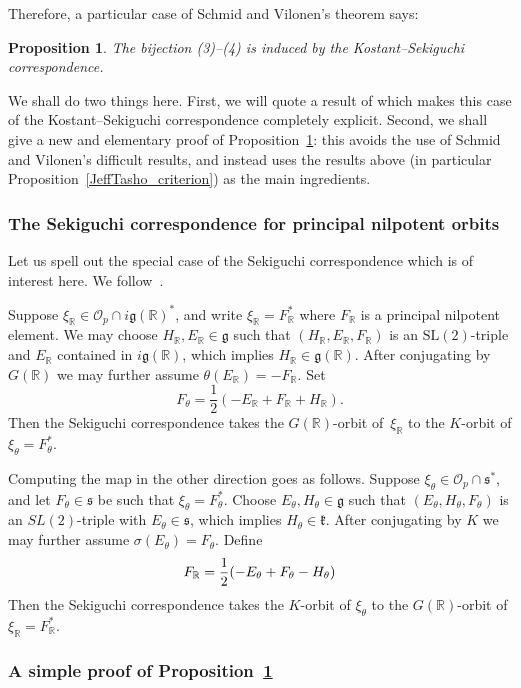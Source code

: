 \documentclass[10pt,leqno]{article}
\newtheorem{proposition}[equation]{Proposition}
\renewcommand{\O}{\mathcal O}
\newcommand{\R}{\mathbb R}
\renewcommand{\k}{\mathfrak k}
\newcommand{\g}{\mathfrak g}
\newcommand{\s}{\mathfrak s}
\newcommand{\Op}{\O_p}
\begin{document}
Therefore, a particular case of Schmid and Vilonen's theorem says: 
\begin{proposition} \label{Sekiguchi_result} The bijection (3)--(4) is induced by the Kostant--Sekiguchi correspondence.
\end{proposition} 
We shall do two things here. First, we will quote a result of \cite{AVAV} which makes this case of the Kostant--Sekiguchi correspondence completely explicit. Second, we shall give a new and elementary proof of Proposition~\ref{Sekiguchi_result}: this avoids the use of Schmid and Vilonen's difficult results, and instead uses the results above (in particular Proposition~\ref{JeffTasho_criterion}) as the main ingredients. 


\subsubsection{The Sekiguchi correspondence for principal nilpotent orbits}\label{sec:concrete_sek}
Let us spell out the special case of the Sekiguchi correspondence which is of interest here. We follow~\cite[Section~2]{AVAV}.


Suppose $\xi_\R\in \Op\cap i\g(\R)^\ast$, and write $\xi_\R = F_\R^\ast$ where $F_\R$ is a principal nilpotent element. We may choose $H_\R, E_\R \in \g$ such that $(H_\R,E_\R,F_\R)$ is an $\mathrm{SL}(2)$-triple and  $E_\R$  contained in $i\g(\R)$,
which implies $H_\R\in \g(\R)$. 
After conjugating by~$G(\R)$ we may further assume $\theta(E_\R)=-F_\R$. Set 
\[   F_\theta=\frac12(-E_\R+F_\R+H_\R).\]
Then the Sekiguchi correspondence takes the $G(\R)$-orbit of~$\xi_\R$ to the $K$-orbit of $\xi_\theta=F_\theta^\ast$. 

Computing the map in the other direction goes as follows.
Suppose $\xi_\theta \in \Op\cap \s^\ast$, and let $F_\theta \in \s$ be such that $\xi_\theta=F_\theta^\ast$. Choose $E_\theta, H_\theta \in \g$ such that $(E_\theta, H_\theta, F_\theta)$ is an $SL(2)$-triple with $E_\theta \in \s$,  which implies $H_\theta\in\k$. After conjugating by $K$ we may further assume $\sigma(E_\theta)=F_\theta$.
Define 
\begin{equation}\label{def_F_R}
  F_\R=\frac12(-E_\theta+F_\theta-H_\theta)\\
\end{equation}
Then the Sekiguchi correspondence takes the $K$-orbit of $\xi_\theta$ to the $G(\R)$-orbit of $\xi_\R = F_\R^\ast$. 

\subsubsection{A simple proof of Proposition~\ref{Sekiguchi_result}}\label{sec:sekiguchi_proof}
\end{document}
